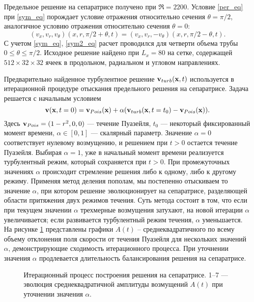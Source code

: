 Предельное решение на сепаратрисе получено при $\Re=2200$. Условие \eqref{per_eq} при \eqref{sym_eq} порождает условие отражения относительно сечения $\theta = \pi/2$, аналогичное условию отражения относительно сечения $\theta = 0$:
\begin{equation} \label{sym2_eq}
(v_x, v_r, v_\theta)(x, r, \pi/2 + \theta, t) = (v_x, v_r, -v_\theta)(x, r, \pi / 2 - \theta, t).
\end{equation}
С учетом \eqref{sym_eq}, \eqref{sym2_eq} расчет проводился для четверти объема трубы $0\leqslant\theta\leqslant\pi/2$. Исходное решение найдено при $L_x = 80$ на сетке, содержащей $512 \times 32 \times  32$ ячеек в продольном, радиальном и угловом направлениях. 

Предварительно найденное турбулентное решение $\mathbf{v}_{turb}(\mathbf{x},t)$ используется в итерационной процедуре отыскания предельного решения на сепаратрисе. Задача решается с начальным условием
\begin{equation} \label{edge_init_eq}
\mathbf{v}(\mathbf{x},t=0) = \mathbf{v}_{Pois}(\mathbf{x})+\alpha(\mathbf{v}_{turb}(\mathbf{x},t=t_0) - \mathbf{v}_{Pois}(\mathbf{x})).
\end{equation}
Здесь $\mathbf{v}_{Pois}=(1-r^2,0,0)$ --- течение Пуазейля, $t_0$ --- некоторый фиксированный момент времени, $\alpha \in [0,1]$ --- скалярный параметр. Значение $\alpha=0$ соответствует нулевому возмущению, и решением при $t > 0$ остается течение Пуазейля. Выбирая $\alpha=1$, уже в начальный момент времени реализуется турбулентный режим, который сохраняется при $t > 0$. При промежуточных значениях $\alpha$ происходит стремление решения либо к одному, либо к другому режиму. Применяя метод деления пополам, мы постепенно отыскиваем то значение $\alpha$, при котором решение эволюционирует на сепаратрисе, разделяющей области притяжения двух режимов течения. Суть метода состоит в том, что если при текущем значении $\alpha$ трехмерные возмущения затухают, на новой итерации $\alpha$ увеличивается; если развивается турбулентный режим течения, $\alpha$ уменьшается. На рисунке \ref{bisection_pic} представлены графики $A(t)$ – среднеквадратичного по всему объему отклонения поля скорости от течения Пуазейля для нескольких значений $\alpha$, демонстрирующие сходимость итерационного процесса. При уточнении значения $\alpha$ продлевается длительность балансирования решения на сепаратрисе.


\begin{figure}
\caption{Итерационный процесс построения решения на сепаратрисе. 1--7 --- эволюция среднеквадратичной амплитуды возмущений $A(t)$ при уточнении значения $\alpha$.}
\label{bisection_pic}
\end{figure}

